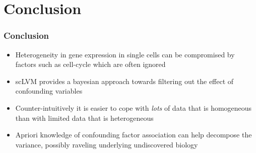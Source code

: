 \documentclass[10pt, compress]{beamer}
\renewcommand{\(}{\begin{columns}}
\renewcommand{\)}{\end{columns}}
\newcommand{\<}[1]{\begin{column}{#1}}
\renewcommand{\>}{\end{column}}
\begin{document}
\section{Conclusion}
\begin{frame}[fragile]
\frametitle{Conclusion}
\begin{itemize}
\item Heterogeneity in gene expression in single cells can be compromised by factors such as cell-cycle which are often ignored
\item scLVM provides a bayesian approach towards filtering out the effect of confounding variables
\item Counter-intuitively it is easier to cope with \textit{lots} of data that is homogeneous than with limited data that is heterogeneous
\item Apriori knowledge of confounding factor association can help decompose the variance, possibly raveling underlying undiscovered biology
\end{itemize}
\end{frame}
\end{document}
